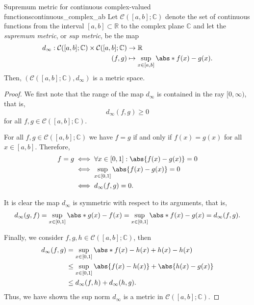 \begin{example}{Supremum metric for continuous complex-valued functions}{continuous_complex_ab}
    Let \(\mathcal{C}([a,b];\mathbb{C})\) denote the set of continuous functions from the interval \([a,b]\subset \mathbb{R}\) to the complex plane \(\mathbb{C}\) and let the \emph{supremum metric}, or \emph{sup metric}, be the map
    \begin{align*}
        d_\infty : \mathcal{C}([a,b];\mathbb{C}) \times \mathcal{C}([a,b];\mathbb{C}) &\to \mathbb{R}\\
        (f, g) &\mapsto \sup_{x\in[a,b]}\abs*{f(x) - g(x)}.
    \end{align*}
    Then, \((\mathcal{C}([a,b];\mathbb{C}), d_\infty)\) is a metric space.
\end{example}
\begin{proof}
    We first note that the range of the map \(d_\infty\) is contained in the ray \([0, \infty)\), that is,
    \begin{equation*}
        d_\infty(f,g) \geq 0
    \end{equation*}
    for all \(f,g \in \mathcal{C}([a,b];\mathbb{C})\).

    For all \(f, g \in \mathcal{C}([a,b]; \mathbb{C})\) we have \(f = g\) if and only if \(f(x) = g(x)\) for all \(x \in [a,b]\). Therefore,
    \begin{align*}
        f = g &\iff \forall x \in [0,1] : \abs{f(x) - g(x)} = 0\\
              &\iff \sup_{x \in [0,1]}  \abs{f(x) - g(x)} = 0\\
              &\iff d_\infty(f,g) = 0.
    \end{align*}

    It is clear the map \(d_\infty\) is symmetric with respect to its arguments, that is,
    \begin{align*}
        d_\infty(g,f) = \sup_{x\in[0,1]}\abs*{g(x) - f(x)}= \sup_{x\in[0,1]} \abs*{f(x) - g(x)} = d_\infty(f,g).
    \end{align*}

    Finally, we consider \(f,g,h \in \mathcal{C}([a,b];\mathbb{C})\), then
    \begin{align*}
        d_\infty(f,g) &= \sup_{x\in[0,1]}\abs*{f(x) - h(x) + h(x) - h(x)}\\\
                      &\leq \sup_{x\in[0,1]} \abs{f(x) - h(x)} + \abs{h(x) - g(x)}\\
                      &\leq d_\infty(f,h) + d_\infty(h,g).
    \end{align*}
    Thus, we have shown the sup norm \(d_\infty\) is a metric in \(\mathcal{C}([a,b];\mathbb{C})\).
\end{proof}


